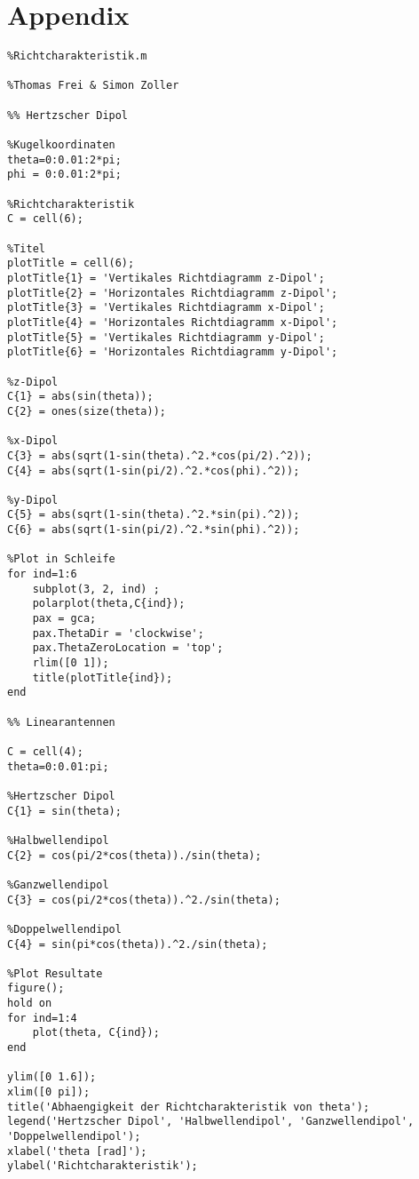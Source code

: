 \section{Appendix}\label{sec:appendix}

\begin{lstlisting}
%Richtcharakteristik.m

%Thomas Frei & Simon Zoller

%% Hertzscher Dipol

%Kugelkoordinaten
theta=0:0.01:2*pi;
phi = 0:0.01:2*pi;

%Richtcharakteristik
C = cell(6);

%Titel
plotTitle = cell(6);
plotTitle{1} = 'Vertikales Richtdiagramm z-Dipol';
plotTitle{2} = 'Horizontales Richtdiagramm z-Dipol';
plotTitle{3} = 'Vertikales Richtdiagramm x-Dipol';
plotTitle{4} = 'Horizontales Richtdiagramm x-Dipol';
plotTitle{5} = 'Vertikales Richtdiagramm y-Dipol';
plotTitle{6} = 'Horizontales Richtdiagramm y-Dipol';

%z-Dipol
C{1} = abs(sin(theta));
C{2} = ones(size(theta));

%x-Dipol
C{3} = abs(sqrt(1-sin(theta).^2.*cos(pi/2).^2));
C{4} = abs(sqrt(1-sin(pi/2).^2.*cos(phi).^2));

%y-Dipol
C{5} = abs(sqrt(1-sin(theta).^2.*sin(pi).^2));
C{6} = abs(sqrt(1-sin(pi/2).^2.*sin(phi).^2));

%Plot in Schleife
for ind=1:6
    subplot(3, 2, ind) ;
    polarplot(theta,C{ind});
    pax = gca;
    pax.ThetaDir = 'clockwise';
    pax.ThetaZeroLocation = 'top';
    rlim([0 1]);
    title(plotTitle{ind});
end

%% Linearantennen

C = cell(4);
theta=0:0.01:pi;

%Hertzscher Dipol
C{1} = sin(theta);

%Halbwellendipol
C{2} = cos(pi/2*cos(theta))./sin(theta);

%Ganzwellendipol
C{3} = cos(pi/2*cos(theta)).^2./sin(theta);

%Doppelwellendipol
C{4} = sin(pi*cos(theta)).^2./sin(theta);

%Plot Resultate
figure();
hold on
for ind=1:4
    plot(theta, C{ind});
end

ylim([0 1.6]);
xlim([0 pi]);
title('Abhaengigkeit der Richtcharakteristik von theta');
legend('Hertzscher Dipol', 'Halbwellendipol', 'Ganzwellendipol', 'Doppelwellendipol');
xlabel('theta [rad]');
ylabel('Richtcharakteristik');
\end{lstlisting}